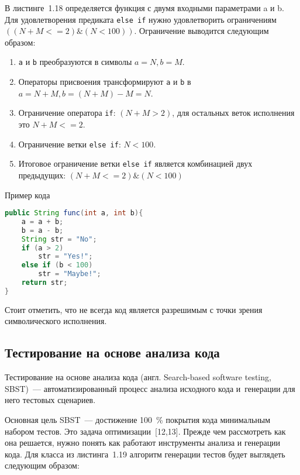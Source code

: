 В листинге~1.18 определяется функция с двумя входными параметрами a и b. Для удовлетворения предиката \texttt{else if} нужно удовлетворить ограничениям \(((N + M <= 2)\&(N < 100))\). Ограничение выводится следующим образом:

\begin{enumerate}
	\item \texttt{a} и \texttt{b} преобразуются в символы  \(a = N, b = M\).
	\item Операторы присвоения трансформируют \texttt{a} и \texttt{b} в  \(a = N + M, b = (N + M) - M = N\).
	\item Ограничение оператора \texttt{if}: \((N + M > 2)\), для остальных веток исполнения это \(N + M <= 2\).
	\item Ограничение ветки \texttt{else if}: \(N < 100\).
	\item Итоговое ограничение ветки \texttt{else if} является комбинацией  двух предыдущих:  \( (N + M <= 2) \& (N < 100)\)
\end{enumerate}

\begin{ListingEnv}[!h]%
	\captiondelim{ } %
	\caption{Пример кода}
	\begin{lstlisting}[language={Java}]
public String func(int a, int b){
	a = a + b;
	b = a - b;
	String str = "No";
	if (a > 2)
		str = "Yes!";
	else if (b < 100)
		str = "Maybe!";
	return str;
}
	\end{lstlisting}
\end{ListingEnv}%

Стоит отметить, что не всегда код является разрешимым с точки зрения символического исполнения.


\subsection{Тестирование на основе анализа кода} 
 
 Тестирование на основе анализа кода (англ. Search-based software testing,  SBST)~--- автоматизированный процесс анализа исходного кода и~генерации для него тестовых сценариев. 
 
 Основная цель SBST~--- достижение 100~\% покрытия кода минимальным набором тестов. Это задача оптимизации~[12,13]. Прежде чем рассмотреть как она решается, нужно понять как работают инструменты  анализа и генерации кода. Для класса из листинга~1.19 алгоритм генерации тестов будет выглядеть следующим образом: 
 
